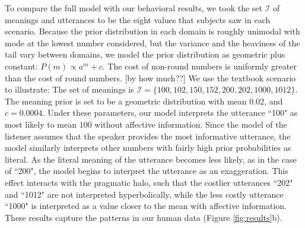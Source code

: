 \documentclass{article} %
\begin{document}
To compare the full model with our behavioral results, we took the set $\mathcal I$ of meanings and utterances to be the eight values that subjects saw in each scenario. Because the prior distribution in each domain is roughly unimodal with mode at the lowest number considered, but the variance and the heaviness of the tail vary between domains, we model the prior distribution as geometric plus constant:
$P(m)\propto a^{m} + c$.
The cost of non-round numbers is uniformly greater than the cost of round numbers. 
[by how much??]
We use the textbook scenario to illustrate: The set of meanings is ${\mathcal I}=\{100, 102, 150, 152, 200, 202, 1000, 1012\}$. The meaning prior is set to be a geometric distribution with mean $0.02$, and $c = 0.0004$. Under these parameters, our model interprets the utterance ``100" as most likely to mean $100$ without affective information. Since the model of the listener assumes that the speaker provides the most informative utterance, the model similarly interprets other numbers with fairly high prior probabilities as literal. As the literal meaning of the utterance becomes less likely, as in the case of ``200", the model begins to interpret the utterance as an exaggeration. This effect interacts with the pragmatic halo, such that the costlier utterances ``202" and ``1012" are not interpreted hyperbolically, while the less costly utterance ``1000" is interpreted as a value closer to the mean with affective information. These results capture the patterns in our human data (Figure \ref{fig:results}b). 
\end{document}
